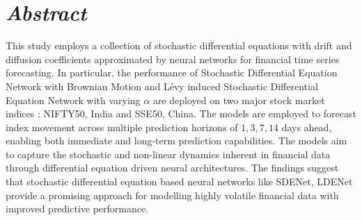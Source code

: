 \section*{\centering \huge \textit{Abstract}}
    This study employs a collection of stochastic differential equations with drift and diffusion coefficients approximated by neural networks for financial time series forecasting. In particular, the performance of Stochastic Differential Equation Network with Brownian Motion and Lévy induced Stochastic Differential Equation Network with varying $\alpha$ are deployed on two major stock market indices : NIFTY50, India and SSE50, China. The models are employed to forecast index movement across multiple prediction horizons of $1, 3, 7, 14$ days ahead, enabling both immediate and long-term prediction capabilities. The models aim to capture the stochastic and non-linear dynamics inherent in financial data through differential equation driven neural architectures. The findings suggest that stochastic differential equation based neural networks like SDENet, LDENet provide a promising approach for modelling highly volatile financial data with improved predictive performance. 
\clearpage
